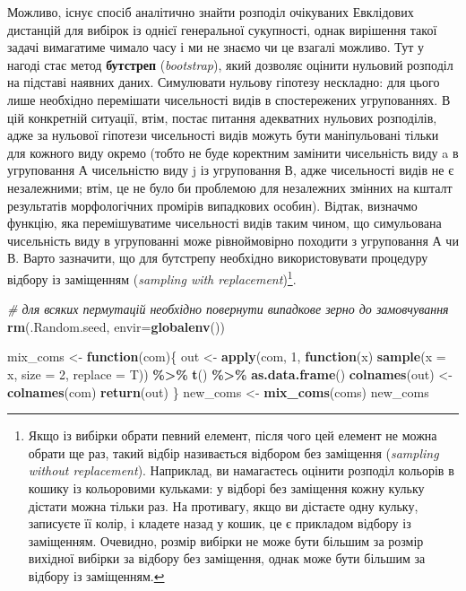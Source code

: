 \documentclass[
  11pt,
]{book}
\newenvironment{Shaded}{\begin{snugshade}}{\end{snugshade}}
\newcommand{\AttributeTok}[1]{\textcolor[rgb]{0.13,0.29,0.53}{#1}}
\newcommand{\CommentTok}[1]{\textcolor[rgb]{0.56,0.35,0.01}{\textit{#1}}}
\newcommand{\ControlFlowTok}[1]{\textcolor[rgb]{0.13,0.29,0.53}{\textbf{#1}}}
\newcommand{\DecValTok}[1]{\textcolor[rgb]{0.00,0.00,0.81}{#1}}
\newcommand{\FunctionTok}[1]{\textcolor[rgb]{0.13,0.29,0.53}{\textbf{#1}}}
\newcommand{\NormalTok}[1]{#1}
\newcommand{\OtherTok}[1]{\textcolor[rgb]{0.56,0.35,0.01}{#1}}
\newcommand{\SpecialCharTok}[1]{\textcolor[rgb]{0.81,0.36,0.00}{\textbf{#1}}}
\begin{document}
Можливо, існує спосіб аналітично знайти розподіл очікуваних Евклідових дистанцій для вибірок із однієї генеральної сукупності, однак вирішення такої задачі вимагатиме чимало часу і ми не знаємо чи це взагалі можливо. Тут у нагоді стає метод \textbf{бутстреп} (\emph{bootstrap}), який дозволяє оцінити нульовий розподіл на підставі наявних даних. Симулювати нульову гіпотезу нескладно: для цього лише необхідно перемішати чисельності видів в спостережених угрупованнях. В цій конкретній ситуації, втім, постає питання адекватних нульових розподілів, адже за нульової гіпотези чисельності видів можуть бути маніпульовані тільки для кожного виду окремо (тобто не буде коректним замінити чисельність виду a в угруповання А чисельністю виду j із угруповання В, адже чисельності видів не є незалежними; втім, це не було би проблемою для незалежних змінних на кшталт результатів морфологічних промірів випадкових особин). Відтак, визначмо функцію, яка перемішуватиме чисельності видів таким чином, що симульована чисельність виду в угрупованні може рівноймовірно походити з угруповання А чи В. Варто зазначити, що для бутстрепу необхідно використовувати процедуру відбору із заміщенням (\emph{sampling with replacement})\footnote{Якщо із вибірки обрати певний елемент, після чого цей елемент не можна обрати ще раз, такий відбір називається відбором без заміщення (\emph{sampling without replacement}). Наприклад, ви намагаєтесь оцінити розподіл кольорів в кошику із кольоровими кульками: у відборі без заміщення кожну кульку дістати можна тільки раз. На противагу, якщо ви дістаєте одну кульку, записуєте її колір, і кладете назад у кошик, це є прикладом відбору із заміщенням. Очевидно, розмір вибірки не може бути більшим за розмір вихідної вибірки за відбору без заміщення, однак може бути більшим за відбору із заміщенням.}.

\begin{Shaded}
\begin{Highlighting}[]
\CommentTok{\# для всяких пермутацій необхідно повернути випадкове зерно до замовчування}
\FunctionTok{rm}\NormalTok{(.Random.seed, }\AttributeTok{envir=}\FunctionTok{globalenv}\NormalTok{())}

\NormalTok{mix\_coms }\OtherTok{\textless{}{-}} \ControlFlowTok{function}\NormalTok{(com)\{}
\NormalTok{  out }\OtherTok{\textless{}{-}} \FunctionTok{apply}\NormalTok{(com, }\DecValTok{1}\NormalTok{, }\ControlFlowTok{function}\NormalTok{(x) }\FunctionTok{sample}\NormalTok{(}\AttributeTok{x =}\NormalTok{ x, }\AttributeTok{size =} \DecValTok{2}\NormalTok{, }\AttributeTok{replace =}\NormalTok{ T)) }\SpecialCharTok{\%\textgreater{}\%} \FunctionTok{t}\NormalTok{() }\SpecialCharTok{\%\textgreater{}\%} \FunctionTok{as.data.frame}\NormalTok{()}
  \FunctionTok{colnames}\NormalTok{(out) }\OtherTok{\textless{}{-}} \FunctionTok{colnames}\NormalTok{(com)}
  \FunctionTok{return}\NormalTok{(out)}
\NormalTok{\}}
\NormalTok{new\_coms }\OtherTok{\textless{}{-}} \FunctionTok{mix\_coms}\NormalTok{(coms)}
\NormalTok{new\_coms}
\end{Highlighting}
\end{Shaded}
\end{document}
